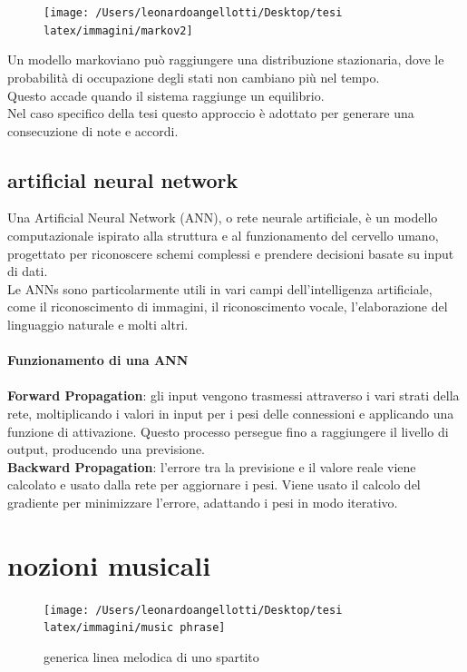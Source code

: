 \documentclass[a4paper,12pt]{report}
\begin{document}
\begin{figure}[H]
    \centering
    \texttt{[image: /Users/leonardoangellotti/Desktop/tesi latex/immagini/markov2]} 
    \label{fig:immagine}
\end{figure}

Un modello markoviano può raggiungere una distribuzione stazionaria, dove le probabilità di occupazione degli stati non cambiano più nel tempo. \\
Questo accade quando il sistema raggiunge un equilibrio. \\
Nel caso specifico della tesi questo approccio è adottato per generare una consecuzione di note e accordi.

\subsection{artificial neural network}

Una Artificial Neural Network (ANN), o rete neurale artificiale, è un modello computazionale ispirato alla struttura e al funzionamento del cervello umano, progettato per riconoscere schemi complessi e prendere decisioni basate su input di dati. \\
Le ANNs sono particolarmente utili in vari campi dell'intelligenza artificiale, come il riconoscimento di immagini, il riconoscimento vocale, l'elaborazione del linguaggio naturale e molti altri. \\
\\
\textbf{Funzionamento di una ANN} \\
\\
\textbf{Forward Propagation}: gli input vengono trasmessi attraverso i vari strati della rete, moltiplicando i valori in input per i pesi delle connessioni e applicando una funzione di attivazione. Questo processo persegue fino a raggiungere il livello di output, producendo una previsione.
\\
\textbf{Backward Propagation}: l'errore tra la previsione e il valore reale viene calcolato e usato dalla rete per aggiornare i pesi. Viene usato il calcolo del gradiente per minimizzare l'errore, adattando i pesi in modo iterativo.

\section{nozioni musicali}

\begin{figure}[H]
    \centering
    \texttt{[image: /Users/leonardoangellotti/Desktop/tesi latex/immagini/music phrase]} 
    \caption{generica linea melodica di uno spartito}
    \label{fig:immagine}
\end{figure}
\end{document}
